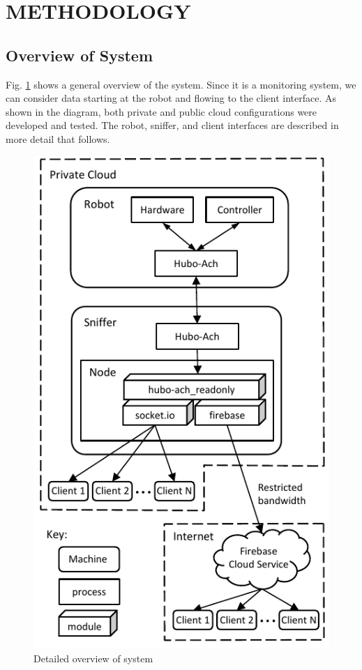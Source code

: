 \documentclass[letterpaper, 10 pt, conference]{ieee/ieeeconf}  %
\begin{document}
\section{METHODOLOGY}

\subsection{Overview of System}

Fig. \ref{fig:Overview} shows a general overview of the system.
Since it is a monitoring system, we can consider data starting at the robot and flowing to the client interface.
As shown in the diagram, both private and public cloud configurations were developed and tested.
The robot, sniffer, and client interfaces are described in more detail that follows.

\begin{figure}[thpb]
  \centering
  \includegraphics{figures/DetailedOverview.pdf}
  \caption{Detailed overview of system}
  \label{fig:Overview}
\end{figure}
\end{document}
